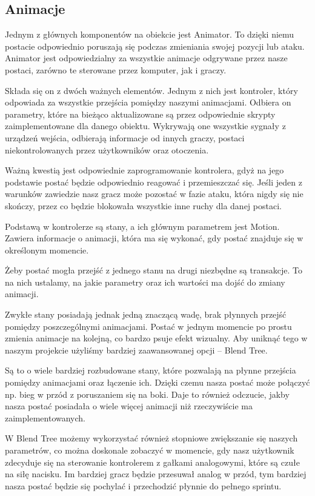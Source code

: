 \subsection{Animacje}
Jednym z głównych komponentów na obiekcie jest Animator.
To dzięki niemu postacie odpowiednio poruszają się podczas zmieniania swojej pozycji lub ataku.
Animator jest odpowiedzialny za wszystkie animacje odgrywane przez nasze postaci, zarówno te sterowane przez komputer, jak i graczy.

Składa się on z dwóch ważnych elementów. Jednym z nich jest kontroler, który odpowiada za wszystkie przejścia pomiędzy naszymi animacjami. Odbiera on parametry, które na bieżąco aktualizowane są przez odpowiednie skrypty zaimplementowane dla danego obiektu. Wykrywają one wszystkie sygnały z urządzeń wejścia, odbierają informacje od innych graczy, postaci niekontrolowanych przez użytkowników oraz otoczenia.

Ważną kwestią jest odpowiednie zaprogramowanie kontrolera, gdyż na jego podstawie postać będzie odpowiednio reagować i przemieszczać się. Jeśli jeden z warunków zawiedzie nasz gracz może pozostać w fazie ataku, która nigdy się nie skończy, przez co będzie blokowała wszystkie inne ruchy dla danej postaci.

Podstawą w kontrolerze są stany, a ich głównym parametrem jest Motion. Zawiera informacje o animacji, która ma się wykonać, gdy postać znajduje się w określonym momencie.

Żeby postać mogła przejść z jednego stanu na drugi niezbędne są transakcje. To na nich ustalamy, na jakie parametry oraz ich wartości ma dojść do zmiany animacji. 

Zwykłe stany posiadają jednak jedną znaczącą wadę, brak płynnych przejść pomiędzy poszczególnymi animacjami. Postać w jednym momencie po prostu zmienia animacje na kolejną, co bardzo psuje efekt wizualny. Aby uniknąć tego w naszym projekcie użyliśmy bardziej zaawansowanej opcji – Blend Tree.

Są to o wiele bardziej rozbudowane stany, które pozwalają na płynne przejścia pomiędzy animacjami oraz łączenie ich. Dzięki czemu nasza postać może połączyć np. bieg w przód z poruszaniem się na boki. Daje to również odczucie, jakby nasza postać posiadała o wiele więcej animacji niż rzeczywiście ma zaimplementowanych.

W Blend Tree możemy wykorzystać również stopniowe zwiększanie się naszych parametrów, co można doskonale zobaczyć w momencie, gdy nasz użytkownik zdecyduje się na sterowanie kontrolerem z gałkami analogowymi, które są czułe na siłę nacisku. Im bardziej gracz będzie przesuwał analog w przód, tym bardziej nasza postać będzie się pochylać i przechodzić płynnie do pełnego sprintu.
